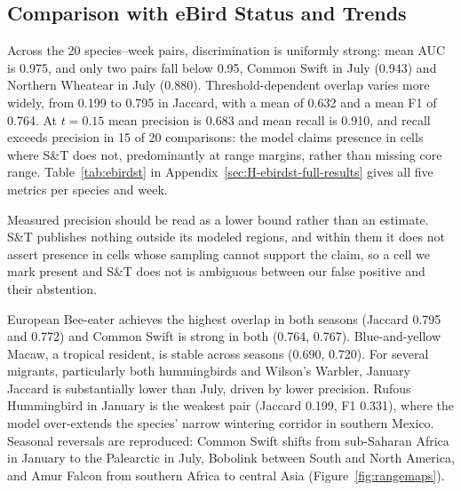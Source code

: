 \subsection{Comparison with eBird Status and Trends}
\label{sec:res-ebirdst}

Across the 20 species--week pairs, discrimination is uniformly strong: mean AUC is 0.975, and only two pairs fall below 0.95, Common Swift in July (0.943) and Northern Wheatear in July (0.880). Threshold-dependent overlap varies more widely, from 0.199 to 0.795 in Jaccard, with a mean of 0.632 and a mean F1 of 0.764. At $t = 0.15$ mean precision is 0.683 and mean recall is 0.910, and recall exceeds precision in 15 of 20 comparisons: the model claims presence in cells where S\&T does not, predominantly at range margins, rather than missing core range. Table~\ref{tab:ebirdst} in Appendix~\ref{sec:H-ebirdst-full-results} gives all five metrics per species and week.

Measured precision should be read as a lower bound rather than an estimate. S\&T publishes nothing outside its modeled regions, and within them it does not assert presence in cells whose sampling cannot support the claim, so a cell we mark present and S\&T does not is ambiguous between our false positive and their abstention.

European Bee-eater achieves the highest overlap in both seasons (Jaccard 0.795 and 0.772) and Common Swift is strong in both (0.764, 0.767). Blue-and-yellow Macaw, a tropical resident, is stable across seasons (0.690, 0.720). For several migrants, particularly both hummingbirds and Wilson's Warbler, January Jaccard is substantially lower than July, driven by lower precision. Rufous Hummingbird in January is the weakest pair (Jaccard 0.199, F1 0.331), where the model over-extends the species' narrow wintering corridor in southern Mexico. Seasonal reversals are reproduced: Common Swift shifts from sub-Saharan Africa in January to the Palearctic in July, Bobolink between South and North America, and Amur Falcon from southern Africa to central Asia (Figure~\ref{fig:rangemaps}).

